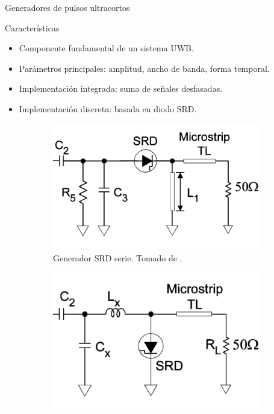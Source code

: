 \documentclass{beamer}
\begin{document}
\begin{frame}{Generadores de pulsos ultracortos}
    \begin{block}{Características}
        \begin{itemize}
            \item Componente fundamental de un sistema UWB.
            \item Parámetros principales: amplitud, ancho de banda, forma
                temporal.
            \item Implementación integrada: suma de señales desfasadas.
            \item Implementación discreta: basada en diodo SRD.
        \end{itemize}
    \end{block}

    \begin{figure}
        \centering
        \begin{subfigure}[b]{0.45\textwidth}
            \centering
            \includegraphics[width=\textwidth]{images/srd_series_generator.png}
            \caption{Generador SRD serie. Tomado de \cite{han2005}.}
            \label{fig:srd_series_generator}
        \end{subfigure}
        \hfill
        \begin{subfigure}[b]{0.45\textwidth}
            \centering
            \includegraphics[width=\textwidth]{images/srd_shunt_generator.png}

\end{subfigure}
\end{figure}
\end{frame}
\end{document}
